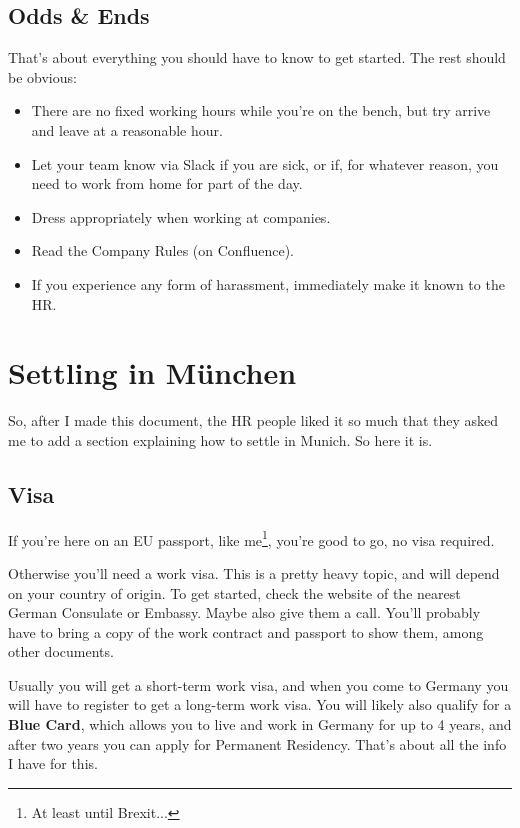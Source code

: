 \documentclass[11pt]{report}
\begin{document}
\section{Odds \& Ends}
That's about everything you should have to know to get started. The rest should be obvious:
\begin{itemize}
\item There are no fixed working hours while you're on the bench, but try arrive and leave at a reasonable hour.
\item Let your team know via Slack if you are sick, or if, for whatever reason, you need to work from home for part of the day.
\item Dress appropriately when working at companies.
\item Read the Company Rules (on Confluence).
\item If you experience any form of harassment, immediately make it known to the HR.
\end{itemize}

\chapter{Settling in M\"unchen}
So, after I made this document, the HR people liked it so much that they asked me to add a section explaining how to settle in Munich. So here it is.

\section{Visa}
If you're here on an EU passport, like me\footnote{At least until Brexit...}, you're good to go, no visa required.

Otherwise you'll need a work visa. This is a pretty heavy topic, and will depend on your country of origin. To get started, check the website of the nearest German Consulate or Embassy. Maybe also give them a call. You'll probably have to bring a copy of the work contract and passport to show them, among other documents.

Usually you will get a short-term work visa, and when you come to Germany you will have to register to get a long-term work visa. You will likely also qualify for a \textbf{Blue Card}, which allows you to live and work in Germany for up to 4 years, and after two years you can apply for Permanent Residency. That's about all the info I have for this.
\end{document}
